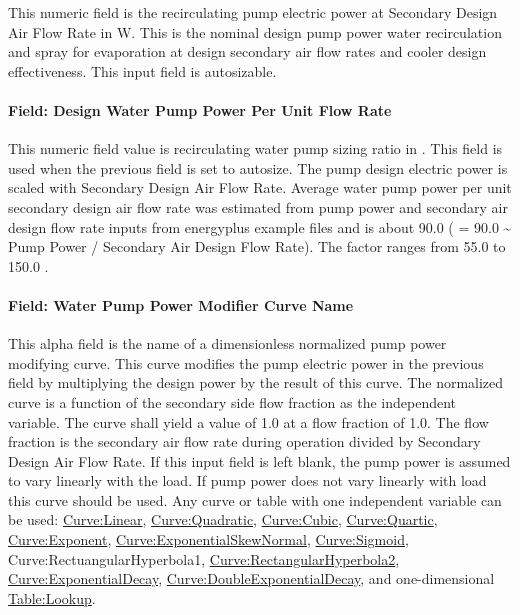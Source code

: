 This numeric field is the recirculating pump electric power at Secondary Design Air Flow Rate in W. This is the nominal design pump power water recirculation and spray for evaporation at design secondary air flow rates and cooler design effectiveness. This input field is autosizable.

\paragraph{Field: Design Water Pump Power Per Unit Flow Rate}\label{field-design-water-pump-power-per-unit-flow-rate-1}

This numeric field value is recirculating water pump sizing ratio in \si{\wattperVolumeFlowRate}. This field is used when the previous field is set to autosize. The pump design electric power is scaled with Secondary Design Air Flow Rate. Average water pump power per unit secondary design air flow rate was estimated from pump power and secondary air design flow rate inputs from energyplus example files and is about 90.0 \si{\wattperVolumeFlowRate} ( = 90.0 \textasciitilde{} Pump Power / Secondary Air Design Flow Rate). The factor ranges from 55.0 to 150.0 \si{\wattperVolumeFlowRate}.

\paragraph{Field: Water Pump Power Modifier Curve Name}\label{field-water-pump-power-modifier-curve-name-1}

This alpha field is the name of a dimensionless normalized pump power modifying curve. This curve modifies the pump electric power in the previous field by multiplying the design power by the result of this curve. The normalized curve is a function of the secondary side flow fraction as the independent variable. The curve shall yield a value of 1.0 at a flow fraction of 1.0. The flow fraction is the secondary air flow rate during operation divided by Secondary Design Air Flow Rate. If this input field is left blank, the pump power is assumed to vary linearly with the load. If pump power does not vary linearly with load this curve should be used. Any curve or table with one independent variable can be used: \hyperref[curvelinear]{Curve:Linear}, \hyperref[curvequadratic]{Curve:Quadratic}, \hyperref[curvecubic]{Curve:Cubic}, \hyperref[curvequartic]{Curve:Quartic}, \hyperref[curveexponent]{Curve:Exponent}, \hyperref[curveexponentialskewnormal]{Curve:ExponentialSkewNormal}, \hyperref[curvesigmoid]{Curve:Sigmoid}, Curve:RectuangularHyperbola1, \hyperref[curverectangularhyperbola2]{Curve:RectangularHyperbola2}, \hyperref[curveexponentialdecay]{Curve:ExponentialDecay}, \hyperref[curvedoubleexponentialdecay]{Curve:DoubleExponentialDecay}, and one-dimensional \hyperref[tablelookup]{Table:Lookup}.


